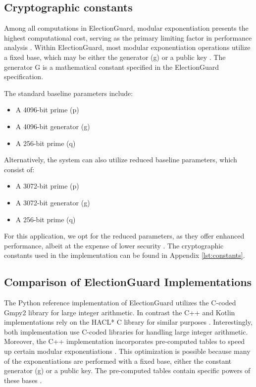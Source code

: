 \subsection{Cryptographic constants}
Among all computations in ElectionGuard, modular exponentiation presents the highest computational cost, serving as the primary limiting factor in performance analysis \cite[22]{eg-spec}. Within ElectionGuard, most modular exponentiation operations utilize a fixed base, which may be either the generator (g) or a public key \cite[22]{eg-paper}. The generator G is a mathematical constant specified in the ElectionGuard specification.

The standard baseline parameters include:
\begin{itemize}
    \item A 4096-bit prime (p) \cite[22]{eg-spec}
    \item A 4096-bit generator (g) \cite[23]{eg-spec}
    \item A 256-bit prime (q) \cite[21]{eg-spec}
\end{itemize}

Alternatively, the system can also utilize reduced baseline parameters, which consist of:
\begin{itemize}
    \item A 3072-bit prime (p) \cite[36]{eg-spec}
    \item A 3072-bit generator (g) \cite[36-37]{eg-spec}
    \item A 256-bit prime (q) \cite[36]{eg-spec}
\end{itemize}

For this application, we opt for the reduced parameters, as they offer enhanced performance, albeit at the expense of lower security \cite[36-37]{eg-spec}. The cryptographic constants used in the implementation can be found in Appendix \ref{lst:constants}.



\subsection{Comparison of ElectionGuard Implementations}
The Python reference implementation of ElectionGuard utilizes the C-coded Gmpy2 library for large integer arithmetic. In contrast the C++ and Kotlin implementations rely on the HACL* C library for similar purposes \cite{eg-docs}. Interestingly, both implementation use C-coded libraries for handling large integer arithmetic. Moreover, the C++ implementation incorporates pre-computed tables to speed up certain modular exponentiations \cite{eg-docs}. This optimization is possible because many of the exponentiations are performed with a fixed base, either the constant generator (g) or a public key. The pre-computed tables contain specific powers of these bases \cite{eg-docs}.

